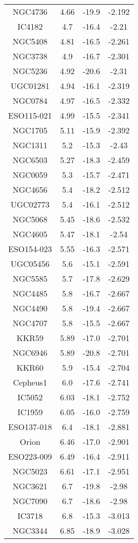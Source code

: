 \begin{longtable}{||c|ccc||}
		NGC4736 & 4.66 & -19.9 & -2.192 \\ IC4182 & 4.7 & -16.4 & -2.21 \\
		NGC5408 & 4.81 & -16.5 & -2.261 \\ NGC3738 & 4.9 & -16.7 & -2.301 \\
		NGC5236 & 4.92 & -20.6 & -2.31 \\ UGC01281 & 4.94 & -16.1 & -2.319 \\
		NGC0784 & 4.97 & -16.5 & -2.332 \\ ESO115-021 & 4.99 & -15.5 & -2.341 \\
		NGC1705 & 5.11 & -15.9 & -2.392 \\ NGC1311 & 5.2 & -15.3 & -2.43 \\
		NGC6503 & 5.27 & -18.3 & -2.459 \\ NGC0059 & 5.3 & -15.7 & -2.471 \\
		NGC4656 & 5.4 & -18.2 & -2.512 \\ UGC02773 & 5.4 & -16.1 & -2.512 \\
		NGC5068 & 5.45 & -18.6 & -2.532 \\ NGC4605 & 5.47 & -18.1 & -2.54 \\
		ESO154-023 & 5.55 & -16.3 & -2.571 \\ UGC05456 & 5.6 & -15.1 & -2.591 \\
		NGC5585 & 5.7 & -17.8 & -2.629 \\ NGC4485 & 5.8 & -16.7 & -2.667 \\
		NGC4490 & 5.8 & -19.4 & -2.667 \\ NGC4707 & 5.8 & -15.5 & -2.667 \\
		KKR59 & 5.89 & -17.0 & -2.701 \\ NGC6946 & 5.89 & -20.8 & -2.701 \\
		KKR60 & 5.9 & -15.4 & -2.704 \\ Cepheus1 & 6.0 & -17.6 & -2.741 \\
		IC5052 & 6.03 & -18.1 & -2.752 \\ IC1959 & 6.05 & -16.0 & -2.759 \\
		ESO137-018 & 6.4 & -18.1 & -2.881 \\ Orion & 6.46 & -17.0 & -2.901 \\
		ESO223-009 & 6.49 & -16.4 & -2.911 \\ NGC5023 & 6.61 & -17.1 & -2.951 \\
		NGC3621 & 6.7 & -19.8 & -2.98 \\ NGC7090 & 6.7 & -18.6 & -2.98 \\
		IC3718 & 6.8 & -15.3 & -3.013 \\ NGC3344 & 6.85 & -18.9 & -3.028 \\

\end{longtable}
